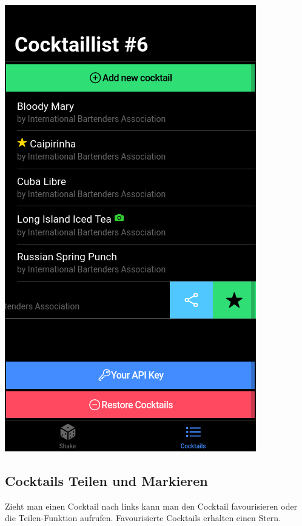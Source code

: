\documentclass[a4paper, 10pt]{article}
\begin{document}
\begin{multicols}{4}
    \begin{center}
        \includegraphics[width=.8\linewidth]{CocktailList-2.png}
    \end{center}
    \columnbreak
    \subsection{Cocktails Teilen und Markieren}
    Zieht man einen Cocktail nach links kann man den Cocktail favourisieren oder die Teilen-Funktion aufrufen. Favourisierte Cocktails erhalten einen Stern.
\end{multicols}
\end{document}
